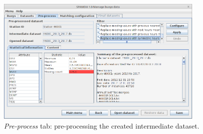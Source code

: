\documentclass[energies,article,accept,moreauthors,pdftex]{Definitions/mdpi}
\begin{document}
\begin{figure}[H]
				\widefigure
				\includegraphics[width=0.90\textwidth]{figures/FigurePreprocess.png}
				\caption{\textit{Pre-process} tab: pre-processing the created intermediate dataset.}\label{fig:preprocess_data}
			\end{figure}
\end{document}

